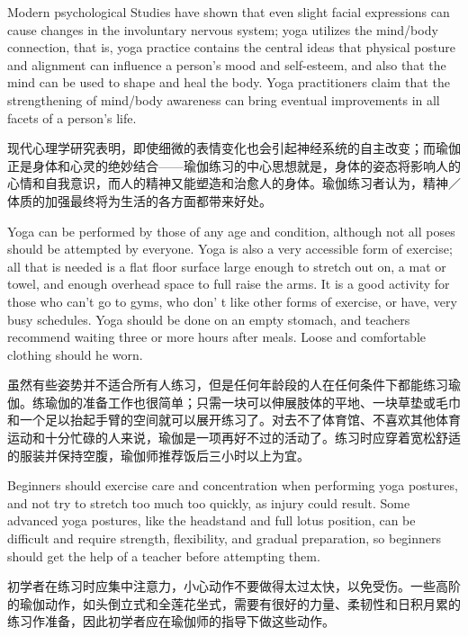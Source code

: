 \documentclass[cs4size, a4paper,12pt]{article}
\newcounter{numpar}
\newcommand*{\newpar}{\numpar{}}
\begin{document}
\newpar Modern psychological Studies have shown that even slight facial expressions can cause changes in the involuntary nervous system; yoga utilizes the mind/body connection, that is, yoga practice contains the central ideas that physical posture and alignment can influence a person's mood and self-esteem, and also that the mind can be used to shape and heal the body. Yoga practitioners claim that the strengthening of mind/body awareness can bring eventual improvements in all facets of a person's life.

现代心理学研究表明，即使细微的表情变化也会引起神经系统的自主改变；而瑜伽正是身体和心灵的绝妙结合——瑜伽练习的中心思想就是，身体的姿态将影响人的心情和自我意识，而人的精神又能塑造和治愈人的身体。瑜伽练习者认为，精神／体质的加强最终将为生活的各方面都带来好处。

\newpar Yoga can be performed by those of any age and condition, although not all poses should be attempted by everyone. Yoga is also a very accessible form of exercise; all that is needed is a flat floor surface large enough to stretch out on, a mat or towel, and enough overhead space to full raise the arms. It is a good activity for those who can't  go to gyms, who don' t like other forms of exercise, or have, very busy schedules. Yoga should be done on an empty stomach, and teachers recommend waiting three or more hours after meals. Loose and comfortable clothing should he worn.

虽然有些姿势并不适合所有人练习，但是任何年龄段的人在任何条件下都能练习瑜伽。练瑜伽的准备工作也很简单；只需一块可以伸展肢体的平地、一块草垫或毛巾和一个足以抬起手臂的空间就可以展开练习了。对去不了体育馆、不喜欢其他体育运动和十分忙碌的人来说，瑜伽是一项再好不过的活动了。练习时应穿着宽松舒适的服装并保持空腹，瑜伽师推荐饭后三小时以上为宜。

\newpar Beginners should exercise care and concentration when performing yoga postures, and not try to stretch too much too quickly, as injury could result. Some advanced yoga postures, like the headstand and full lotus position, can be difficult and require strength, flexibility, and gradual preparation, so beginners should get the help of a teacher before attempting them.

初学者在练习时应集中注意力，小心动作不要做得太过太快，以免受伤。一些高阶的瑜伽动作，如头倒立式和全莲花坐式，需要有很好的力量、柔韧性和日积月累的练习作准备，因此初学者应在瑜伽师的指导下做这些动作。
\end{document}
